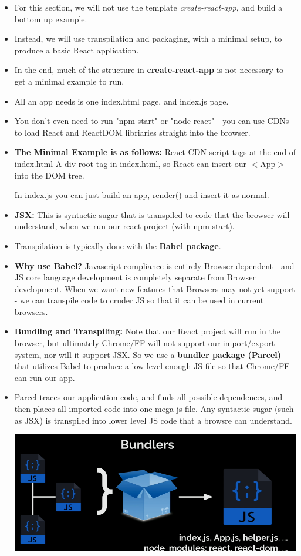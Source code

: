 \documentclass[8pt,a4paper]{extarticle}
\begin{document}
\begin{itemize}
\item For this section, we will not use the template \textit{create-react-app}, and build a bottom up example.
\item Instead, we will use transpilation and packaging, with a minimal setup, to produce a basic React application.
\item In the end, much of the structure in \textbf{create-react-app} is not necessary to get a minimal example to run.
\item All an app needs is one index.html page, and index.js page.
\item You don't even need to run "npm start" or "node react" - you can use CDNs to load React and ReactDOM libriaries straight into the browser.
\item \textbf{The Minimal Example is as follows:}
\mitem React CDN script tags at the end of index.html
\mitem A div root tag in index.html, so React can insert our $<$App$>$ into the DOM tree.

In index.js you can just build an app, render() and insert it as normal.
\item \textbf{JSX:} This is syntactic sugar that is transpiled to code that the browser will understand, when we run our react project (with npm start).
\item Transpilation is typically done with the \textbf{Babel package}.
\item \textbf{Why use Babel?} Javascript compliance is entirely Browser dependent - and JS core language development is completely separate from Browser development. When we want new features that Browsers may not yet support - we can transpile code to cruder JS so that it can be used in current browsers.

\item \textbf{Bundling and Transpiling:} Note that our React project will run in the browser, but ultimately Chrome/FF will not support our import/export system, nor will it support JSX. So we use a \textbf{bundler package (Parcel)} that utilizes Babel to produce a low-level enough JS file so that Chrome/FF can run our app. 
\item Parcel traces our application code, and finds all possible dependences, and then places all imported code into one mega-js file. Any syntactic sugar (such as JSX) is transpiled into lower level JS code that a browsre can understand.

\includegraphics[scale=0.24]{bundle.png}


\end{itemize}
\end{document}
